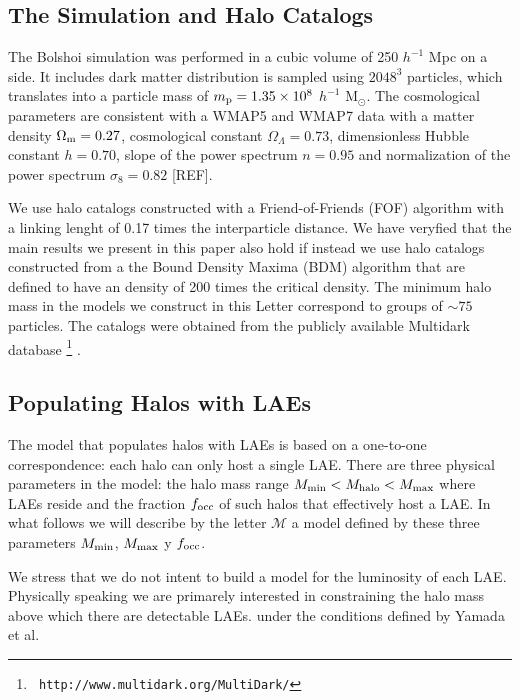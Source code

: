 \documentclass{emulateapj}
\begin{document}
\subsection{The Simulation and Halo Catalogs}

The Bolshoi simulation was performed in a cubic volume of 250 $h^{-1}$
Mpc on a side. It includes dark matter distribution is sampled using
$2048^{3}$ particles, which translates into a particle mass of $m_{\rm
  p}=1.35\times 10^{8}$ $h^{-1}$ M$_{\odot}$.  The cosmological
parameters are consistent with a WMAP5 and WMAP7 data with a matter
density $\Omega_{\rm m} = 0.27$, cosmological constant
$\Omega_{\Lambda}=0.73$, dimensionless Hubble constant $h=0.70$, slope
of the power spectrum $n=0.95$ and normalization of the power spectrum
$\sigma_{8}=0.82$ [REF]. 

We use halo catalogs constructed with a Friend-of-Friends (FOF)
algorithm with a linking lenght of 0.17 times the interparticle
distance. We have veryfied that the main results we present in this
paper also hold if instead we use halo catalogs constructed from a the
Bound Density Maxima (BDM) algorithm \citep{KlypinBDM} that are
defined to have an density of 200 times the critical density. The
minimum halo mass in the models we construct in this Letter correspond
to groups of $\sim 75$ particles. The catalogs were obtained from the
publicly available Multidark database \footnote{{\tt
    http://www.multidark.org/MultiDark/}} \citep{2011arXiv1109.0003R}.  



\subsection{Populating Halos with LAEs}
\label{subsec:mocks}

The model that populates halos with LAEs is based on a one-to-one
correspondence: each halo can only host a single LAE. There are three
physical parameters in the model: the halo mass range $M_{\rm min}<
M_{\rm halo} < M_{\rm max}$ where LAEs reside and the fraction $f_{\rm
  occ}$ of such halos that effectively host a LAE. In what follows we
will describe by the letter ${\mathcal M}$ a model defined by these
three parameters $M_{\rm min}$, $M_{\rm max}$ y $f_{\rm occ}$. 

We stress that we do not intent to build a model for the luminosity of
each LAE. Physically speaking we are primarely interested in
constraining the halo mass above which there are detectable
LAEs. under the conditions defined by Yamada et al.  
\end{document}

